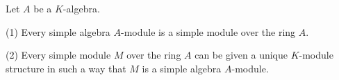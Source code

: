 \begin{theorem}
    Let $A$ be a $K$-algebra.

    (1)
    Every simple algebra $A$-module is a simple module over the ring $A$.

    (2)
    Every simple module $M$ over the ring $A$ can be given a unique $K$-module structure in such a way that $M$ is a simple algebra $A$-module.
\end{theorem}






